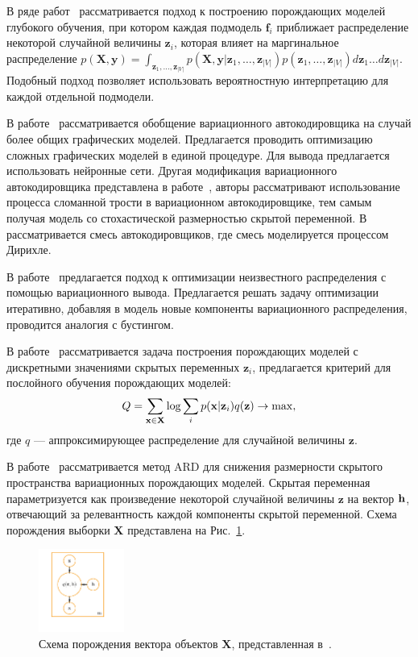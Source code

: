 В ряде работ~\cite{vae_graph,vae_stick,vae_mix,var_boost,layerwise_optimal} рассматривается подход к построению порождающих моделей глубокого обучения, при котором каждая подмодель $\mathbf{f}_i$ приближает распределение некоторой случайной величины $\mathbf{z}_i$, которая влияет на маргинальное распределение $p(\mathbf{X}, \mathbf{y}) = \int_{\mathbf{z}_1, \dots, \mathbf{z}_{|V|}} p(\mathbf{X}, \mathbf{y}|\mathbf{z}_1, \dots, \mathbf{z}_{|V|})p(\mathbf{z}_1, \dots, \mathbf{z}_{|V|})d\mathbf{z}_1\dots d\mathbf{z}_{|V|}.$ Подобный подход позволяет использовать вероятностную интерпретацию для каждой отдельной подмодели. 

В работе~\cite{vae_graph} рассматривается обобщение вариационного автокодировщика на случай более общих графических моделей. Предлагается проводить оптимизацию сложных графических моделей в единой процедуре. Для вывода предлагается использовать нейронные сети.
Другая модификация вариационного автокодировщика представлена в работе~\cite{vae_stick}, авторы рассматривают использование процесса сломанной трости в вариационном автокодировщике, тем самым получая модель со стохастической размерностью скрытой переменной. В~\cite{vae_mix} рассматривается смесь автокодировщиков, где смесь моделируется процессом Дирихле.

В работе~\cite{var_boost} предлагается подход к оптимизации неизвестного распределения с помощью вариационного вывода. Предлагается решать задачу оптимизации итеративно, добавляя в модель новые компоненты вариационного распределения, проводится аналогия с бустингом.

В работе~\cite{layerwise_optimal} рассматривается задача построения порождающих моделей с дискретными значениями скрытых переменных $\mathbf{z}_i$, предлагается критерий для послойного обучения порождающих моделей:
\[
    Q = \sum_{\mathbf{x} \in \mathbf{X}} \text{log} \sum_{i}p(\mathbf{x}|\mathbf{z}_i)q(\mathbf{z}) \to \max,
\]
где $q$ --- аппроксимирующее распределение для случайной величины $\mathbf{z}$. 

В работе~\cite{vae_ard} рассматривается метод ARD для снижения размерности скрытого пространства вариационных порождающих моделей. Скрытая переменная параметризуется как  произведение некоторой случайной величины $\mathbf{z}$  на вектор $\mathbf{h}$, отвечающий за релевантность каждой компоненты скрытой переменной. Схема порождения выборки $\mathbf{X}$ представлена на Рис.~\ref{fig:vae_ard}.

\begin{figure}[H]
\centering
\includegraphics[width=0.25\textwidth]{./plots/notebooks/ae_plate.pdf}
\caption{Схема порождения вектора объектов $\mathbf{X}$, представленная в~\cite{vae_ard}.}
\label{fig:vae_ard}

\end{figure}

